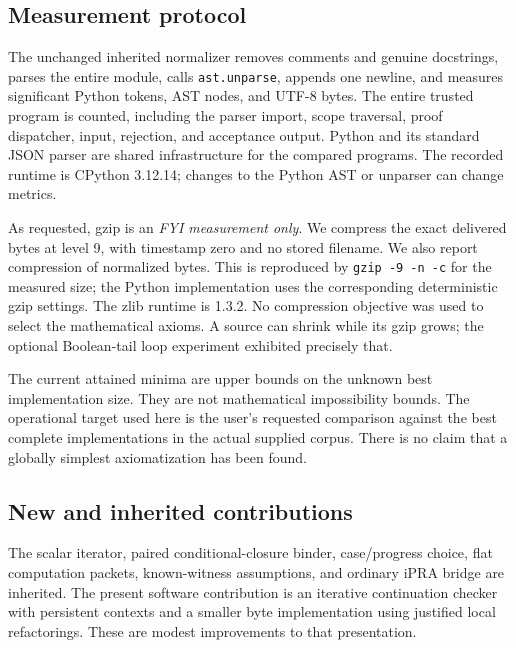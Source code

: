 \documentclass[11pt,letterpaper]{article}
\theoremstyle{definition}\newtheorem{definition}[theorem]{Definition}
\theoremstyle{remark}\newtheorem{remark}[theorem]{Remark}
\newcommand{\file}[1]{{\small\nolinkurl{#1}}}
\begin{document}
\subsection{Measurement protocol}

The unchanged inherited normalizer removes comments and genuine
docstrings, parses the entire module, calls \file{ast.unparse}, appends
one newline, and measures significant Python tokens, AST nodes, and
UTF-8 bytes. The entire trusted program is counted, including the
parser import, scope traversal, proof dispatcher, input, rejection, and
acceptance output. Python and its standard JSON parser are shared
infrastructure for the compared programs. The recorded runtime is
CPython 3.12.14; changes to the Python AST or unparser can change metrics.

As requested, gzip is an \emph{FYI measurement only}. We compress the
exact delivered bytes at level 9, with timestamp zero and no stored
filename. We also report compression of normalized bytes. This is
reproduced by \file{gzip -9 -n -c} for the measured size; the Python
implementation uses the corresponding deterministic gzip settings.
The zlib runtime is 1.3.2. No compression objective was used to select
the mathematical axioms. A source can shrink while its gzip grows;
the optional Boolean-tail loop experiment exhibited precisely that.

The current attained minima are upper bounds on the unknown best
implementation size. They are not mathematical impossibility bounds.
The operational target used here is the user's requested comparison
against the best complete implementations in the actual supplied corpus.
There is no claim that a globally simplest axiomatization has been found.

\subsection{New and inherited contributions}

The scalar iterator, paired conditional-closure binder, case/progress
choice, flat computation packets, known-witness assumptions, and ordinary
iPRA bridge are inherited. The present software contribution is an
iterative continuation checker with persistent contexts and a smaller
byte implementation using justified local refactorings. These are
modest improvements to that presentation.
\end{document}
